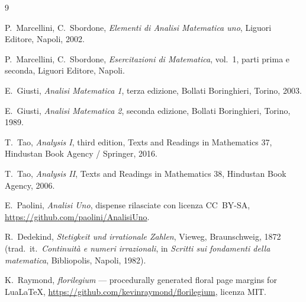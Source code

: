 \begin{thebibliography}{9}

P.~Marcellini, C.~Sbordone, \emph{Elementi di Analisi Matematica uno}, Liguori Editore,
Napoli, 2002.

P.~Marcellini, C.~Sbordone, \emph{Esercitazioni di Matematica}, vol.~1, parti prima e
seconda, Liguori Editore, Napoli.

E.~Giusti, \emph{Analisi Matematica 1}, terza edizione, Bollati Boringhieri, Torino,
2003.

E.~Giusti, \emph{Analisi Matematica 2}, seconda edizione, Bollati Boringhieri, Torino,
1989.

T.~Tao, \emph{Analysis I}, third edition, Texts and Readings in Mathematics 37,
Hindustan Book Agency / Springer, 2016.

T.~Tao, \emph{Analysis II}, Texts and Readings in Mathematics 38, Hindustan Book Agency,
2006.

E.~Paolini, \emph{Analisi Uno}, dispense rilasciate con licenza CC~BY-SA,
\url{https://github.com/paolini/AnalisiUno}.

R.~Dedekind, \emph{Stetigkeit und irrationale Zahlen}, Vieweg, Braunschweig, 1872
(trad.\ it.\ \emph{Continuità e numeri irrazionali}, in \emph{Scritti sui fondamenti
della matematica}, Bibliopolis, Napoli, 1982).

K.~Raymond, \emph{florilegium} --- procedurally generated floral page margins for
LuaLaTeX, \url{https://github.com/kevinraymond/florilegium}, licenza MIT.
\end{thebibliography}
